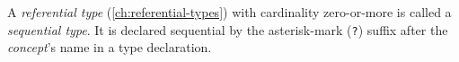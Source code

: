 A \emph{referential type} (\ref{ch:referential-types})
with cardinality zero-or-more is called a \emph{sequential type}.
It is declared sequential by the asterisk-mark (\verb|?|) suffix
after the \emph{concept}'s name in a type declaration.
